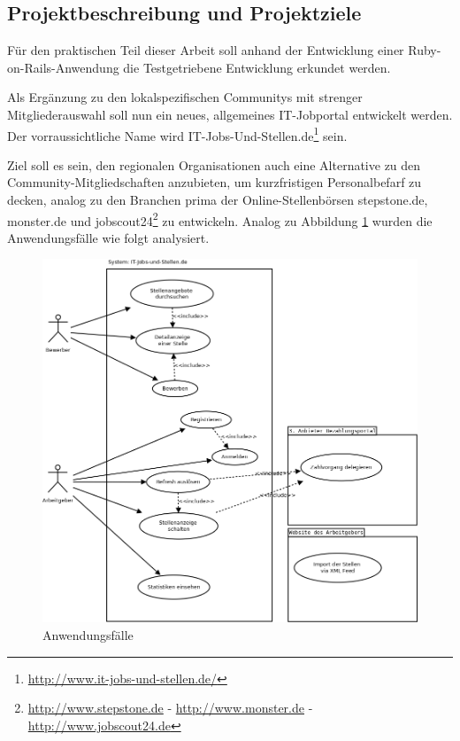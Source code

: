\subsection{Projektbeschreibung und Projektziele}
Für den praktischen Teil dieser Arbeit soll anhand der Entwicklung einer Ruby-on-Rails-Anwendung die Testgetriebene Entwicklung erkundet werden.

Als Ergänzung zu den lokalspezifischen Communitys mit strenger Mitgliederauswahl soll nun ein neues, allgemeines IT-Jobportal entwickelt werden. Der vorraussichtliche Name wird IT-Jobs-Und-Stellen.de\footnote{\url{http://www.it-jobs-und-stellen.de/}} sein.

Ziel soll es sein, den regionalen Organisationen auch eine Alternative zu den Community-Mitgliedschaften anzubieten, um kurzfristigen Personalbefarf zu decken, analog zu den Branchen prima der Online-Stellenbörsen stepstone.de, monster.de und jobscout24\footnote{\url{http://www.stepstone.de} - \url{http://www.monster.de} - \url{http://www.jobscout24.de}} zu entwickeln. Analog zu Abbildung \ref{fig:usecases} wurden die Anwendungsfälle wie folgt analysiert.


\begin{figure}[htbp]
 \centering
 \includegraphics[width=1\textwidth]{./material/usecases.png}
 \caption{Anwendungsfälle}
 \label{fig:usecases}
\end{figure}


